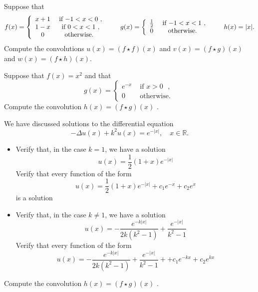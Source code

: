 \documentclass[11pt]{article}
\begin{document}

\begin{exercise}
    Suppose that
    \begin{align*}
        f(x) = \left\{\begin{array}{cc} x+1 & \text{ if $-1 < x < 0$ }, \\  1-x & \text{ if $ 0 < x < 1$ }, \\  0 & \text{ otherwise. } \end{array}\right.
        \qquad 
        g(x) = \left\{\begin{array}{cc} \frac 1 2 & \text{ if $-1 < x < 1$ }, \\ 0 & \text{ otherwise. } \end{array}\right.
        \qquad 
        h(x) = |x|
        .
    \end{align*}
    Compute the convolutions $u(x) = (f \star f)(x)$ and $v(x) = (f \star g)(x)$ and $w(x) = (f \star h)(x)$.
\end{exercise}
\begin{solution} 
\end{solution}



\begin{exercise}
    Suppose that $f(x) = x^2$ and that
    \[
        g(x) = \left\{\begin{array}{cc} e^{-x} & \text{ if $x > 0$ }, \\ 0 & \text{ otherwise. } \end{array}\right.
    \]
    Compute the convolution $h(x) = (f \star g)(x)$ .
\end{exercise}

\begin{solution}     
\end{solution}


\begin{exercise}
    We have discussed solutions to the differential equation 
    \[
        - \Delta u(x) + k^2 u(x) = e^{-|x|}, \quad x \in \mathbb R.
    \]
    \begin{itemize}
        \item 
        Verify that, in the case $k=1$, we have a solution 
        \[
            u(x) = \frac 1 2 (1+x) e^{-|x|} 
        \]
        Verify that every function of the form 
        \[
            u(x) = \frac 1 2 (1+x) e^{-|x|} + c_1 e^{-x} + c_2 e^{x} 
        \]
        is a solution 
        \item 
        Verify that, in the case $k \neq 1$, we have a solution 
        \[
            u(x) = - \frac{ e^{-k|x|} }{ 2k (k^2-1) } + \frac{ e^{-|x|} }{ k^2-1 }
        \]
        Verify that every function of the form 
        \[
            u(x) = - \frac{ e^{-k|x|} }{ 2k (k^2-1) } + \frac{ e^{-|x|} }{ k^2-1 } +  + c_1 e^{-kx} + c_2 e^{kx} 
        \]        
    \end{itemize}
    Compute the convolution $h(x) = (f \star g)(x)$ .
\end{exercise}
\end{document}
